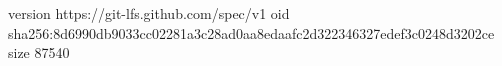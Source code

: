 version https://git-lfs.github.com/spec/v1
oid sha256:8d6990db9033cc02281a3c28ad0aa8edaafc2d322346327edef3c0248d3202ce
size 87540
